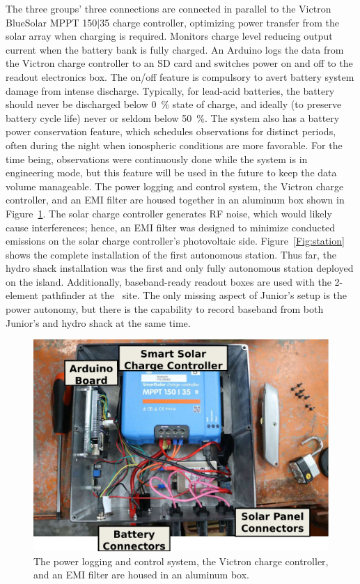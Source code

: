 The three groups' three connections are connected in parallel to the Victron BlueSolar MPPT 150$\vert$35 charge controller, optimizing power transfer from the solar array when charging is required. Monitors charge level reducing output current when the battery bank is fully charged. An Arduino logs the data from the Victron charge controller to an SD card and switches power on and off to the readout electronics box. The on/off feature is compulsory to avert battery system damage from intense discharge. Typically, for lead-acid batteries, the battery should never be discharged below \SI{0}{\percent} state of charge, and ideally (to preserve battery cycle life) never or seldom below \SI{50}{\percent}. The system also has a battery power conservation feature, which schedules observations for distinct periods, often during the night when ionospheric conditions are more favorable. For the time being, observations were continuously done while the system is in engineering mode, but this feature will be used in the future to keep the data volume manageable. The power logging and control system, the Victron charge controller, and an EMI filter are housed together in an aluminum box shown in Figure~\ref{Fig:power_box_interior}. The solar charge controller generates RF noise, which would likely cause interferences; hence, an EMI filter was designed to minimize conducted emissions on the solar charge controller's photovoltaic side. Figure~\ref{Fig:station} shows the complete installation of the first autonomous station. Thus far, the hydro shack installation was the first and only fully autonomous station deployed on the island. Additionally, baseband-ready readout boxes are used with the 2-element pathfinder at the \prizm\ site. The only missing aspect of Junior's setup is the power autonomy, but there is the capability to record baseband from both Junior's and hydro shack at the same time.

\begin{figure}
	\centering
	\includegraphics[width=\linewidth]{Figures/power_box_interior}
	\caption{The power logging and control system, the Victron charge controller, and an EMI filter are housed in an aluminum box.}
	\label{Fig:power_box_interior}
\end{figure}

